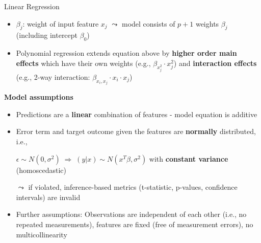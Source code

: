 \documentclass[11pt,compress,t,notes=noshow, aspectratio=169, xcolor=table]{beamer}
\begin{document}
\begin{frame}[c]{Linear Regression}
    \begin{itemize}
        \item $\beta_j$: weight of input feature $x_j$ $\leadsto$ model consists of $p+1$ weights $\beta_j$ (including intercept $\beta_0$)
        \item Polynomial regression extends equation above by \textbf{higher order main effects} which have their own weights (e.g., $\beta_{x_j^2} \cdot x_j^2$) and \textbf{interaction effects} (e.g., 2-way interaction: $\beta_{x_i, x_j} \cdot x_i \cdot x_j$)
    \end{itemize}
   \vspace*{0.2cm} 
   \pause
    \textbf{Model assumptions}
    \begin{itemize}
    \item Predictions are a \textbf{linear} combination of features - model equation is additive%
    \item Error term and target outcome given the features are \textbf{normally} distributed, i.e.,\\
    \centerline{$\epsilon \sim N(0, \sigma^2) \; \Rightarrow \; (y \vert x) \sim N(x^T \beta, \sigma^2)$ with \textbf{constant variance} (homoscedastic)}
    $\leadsto$ if violated, inference-based metrics (t-statistic, p-values, confidence intervals) are invalid
    \item Further assumptions: Observations are independent of each other (i.e., no repeated measurements), features are fixed (free of measurement errors), no multicollinearity

\end{itemize}
\end{frame}
\end{document}
